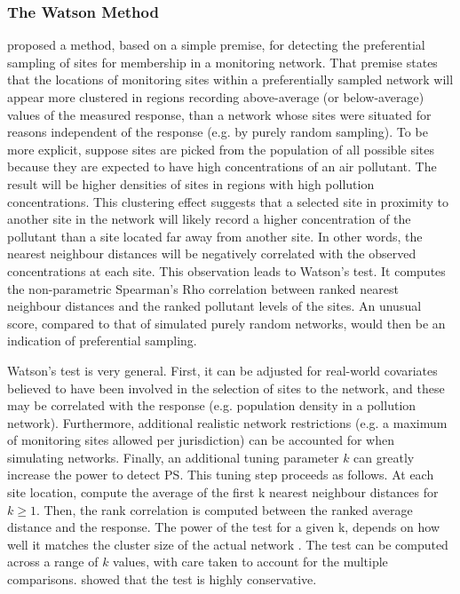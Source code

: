 \documentclass{article}
\begin{document}
\subsubsection*{The Watson Method} \label{subsubsec:WatsonPrefSample}
\cite{watson2020} proposed a method, based on a simple premise, for detecting the preferential sampling of sites for membership in a monitoring network. That premise states that the locations of monitoring sites within a preferentially sampled network will appear more clustered in regions recording above-average (or below-average) values of the measured response, than a network whose sites were situated for reasons independent of the response (e.g. by purely random sampling).
To be more explicit, suppose sites are picked from the population of all possible sites because they are expected to have high concentrations of an air pollutant. The result will be higher densities of sites in regions with high pollution concentrations.  This clustering effect suggests that a selected site in proximity to another site in the network will likely record a higher concentration of the pollutant than a site located far away from another site.
In other words, the nearest neighbour distances will be negatively correlated with the observed concentrations at each site. 
This observation leads to Watson's test. It computes the non-parametric Spearman's Rho correlation between ranked nearest neighbour distances and the ranked pollutant levels of the sites. An unusual score, compared to that of simulated purely random networks, would then be an indication of preferential sampling.

Watson's test \cite{watson2019} is very general. First, it can be adjusted for real-world covariates believed to have been involved in the selection of sites to the network, and these may be correlated with the response (e.g. population density in a pollution network). Furthermore, additional realistic network restrictions (e.g. a maximum of monitoring sites allowed per jurisdiction) can be accounted for when simulating networks. Finally, an additional tuning parameter $k$ can greatly increase the power to detect PS. This tuning step proceeds as follows. At each site location, compute the average of the first \gls{k} nearest neighbour distances for $ k \geq 1$. Then, the rank correlation is computed between the ranked average distance and the response. The power of the test for a given \gls{k}, depends on how well it matches the cluster size of the actual network \citep{watson2020}. The test can be computed across a range of $k$ values, with care taken to account for the multiple comparisons. \citet{watson2020} showed that the test is highly conservative.   
\end{document}
